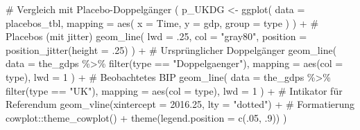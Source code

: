 \documentclass[
  a4paper,
  DIV=11,
  oneside]{scrreprt}
\newenvironment{Shaded}{\begin{snugshade}}{\end{snugshade}}
\newcommand{\AttributeTok}[1]{\textcolor[rgb]{0.40,0.45,0.13}{#1}}
\newcommand{\CommentTok}[1]{\textcolor[rgb]{0.37,0.37,0.37}{#1}}
\newcommand{\DecValTok}[1]{\textcolor[rgb]{0.68,0.00,0.00}{#1}}
\newcommand{\FloatTok}[1]{\textcolor[rgb]{0.68,0.00,0.00}{#1}}
\newcommand{\FunctionTok}[1]{\textcolor[rgb]{0.28,0.35,0.67}{#1}}
\newcommand{\NormalTok}[1]{\textcolor[rgb]{0.00,0.23,0.31}{#1}}
\newcommand{\OtherTok}[1]{\textcolor[rgb]{0.00,0.23,0.31}{#1}}
\newcommand{\SpecialCharTok}[1]{\textcolor[rgb]{0.37,0.37,0.37}{#1}}
\newcommand{\StringTok}[1]{\textcolor[rgb]{0.13,0.47,0.30}{#1}}
\begin{document}
\begin{Shaded}
\begin{Highlighting}[]
\CommentTok{\# Vergleich mit Placebo{-}Doppelgänger}
\NormalTok{(}
\NormalTok{  p\_UKDG }\OtherTok{\textless{}{-}} \FunctionTok{ggplot}\NormalTok{(}
    \AttributeTok{data =}\NormalTok{ placebos\_tbl,}
    \AttributeTok{mapping =} \FunctionTok{aes}\NormalTok{(}
      \AttributeTok{x =}\NormalTok{ Time, }
      \AttributeTok{y =}\NormalTok{ gdp, }
      \AttributeTok{group =}\NormalTok{ type}
\NormalTok{    )}
\NormalTok{  ) }\SpecialCharTok{+}
    \CommentTok{\# Placebos (mit jitter)}
    \FunctionTok{geom\_line}\NormalTok{(}
      \AttributeTok{lwd =}\NormalTok{ .}\DecValTok{25}\NormalTok{, }
      \AttributeTok{col =} \StringTok{"gray80"}\NormalTok{,}
      \AttributeTok{position =} \FunctionTok{position\_jitter}\NormalTok{(}\AttributeTok{height =}\NormalTok{ .}\DecValTok{25}\NormalTok{)}
\NormalTok{    ) }\SpecialCharTok{+}
    \CommentTok{\# Ursprünglicher Doppelgänger}
    \FunctionTok{geom\_line}\NormalTok{(}
      \AttributeTok{data =}\NormalTok{ the\_gdps }\SpecialCharTok{\%\textgreater{}\%} 
        \FunctionTok{filter}\NormalTok{(type }\SpecialCharTok{==} \StringTok{"Doppelgaenger"}\NormalTok{), }
      \AttributeTok{mapping =} \FunctionTok{aes}\NormalTok{(}\AttributeTok{col =}\NormalTok{ type), }
      \AttributeTok{lwd =} \DecValTok{1}
\NormalTok{    ) }\SpecialCharTok{+}
    \CommentTok{\# Beobachtetes BIP}
    \FunctionTok{geom\_line}\NormalTok{(}
      \AttributeTok{data =}\NormalTok{ the\_gdps }\SpecialCharTok{\%\textgreater{}\%} 
        \FunctionTok{filter}\NormalTok{(type }\SpecialCharTok{==} \StringTok{"UK"}\NormalTok{), }
      \AttributeTok{mapping =} \FunctionTok{aes}\NormalTok{(}\AttributeTok{col =}\NormalTok{ type), }
      \AttributeTok{lwd =} \DecValTok{1}
\NormalTok{    ) }\SpecialCharTok{+}
    \CommentTok{\# Intikator für Referendum}
    \FunctionTok{geom\_vline}\NormalTok{(}\AttributeTok{xintercept =} \FloatTok{2016.25}\NormalTok{, }\AttributeTok{lty =} \StringTok{"dotted"}\NormalTok{) }\SpecialCharTok{+}
    \CommentTok{\# Formatierung}
\NormalTok{    cowplot}\SpecialCharTok{::}\FunctionTok{theme\_cowplot}\NormalTok{() }\SpecialCharTok{+}
    \FunctionTok{theme}\NormalTok{(}\AttributeTok{legend.position =} \FunctionTok{c}\NormalTok{(.}\DecValTok{05}\NormalTok{, .}\DecValTok{9}\NormalTok{))}
\NormalTok{)}
\end{Highlighting}
\end{Shaded}
\end{document}
